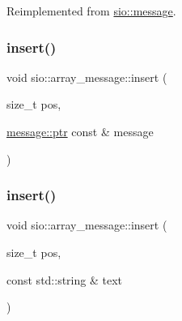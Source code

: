 Reimplemented from \hyperlink{classsio_1_1message_af310192e16427f655dc89c627aae4fe7}{sio\+::message}.

\mbox{\label{classsio_1_1array__message_a5bf35c4605d386ca824c0948d991bed2}} 
\subsubsection{\texorpdfstring{insert()}{insert()}\hspace{0.1cm}{\footnotesize\ttfamily [1/5]}}
{\footnotesize\ttfamily void sio\+::array\+\_\+message\+::insert (\begin{DoxyParamCaption}\item[{size\+\_\+t}]{pos,  }\item[{\hyperlink{classsio_1_1message_a6340b6fef57e4516eb17928b1885a615}{message\+::ptr} const \&}]{message }\end{DoxyParamCaption})\hspace{0.3cm}{\ttfamily [inline]}}

\mbox{\label{classsio_1_1array__message_a6c42d79eee6b499ffd08769c741d5b7f}} 
\subsubsection{\texorpdfstring{insert()}{insert()}\hspace{0.1cm}{\footnotesize\ttfamily [2/5]}}
{\footnotesize\ttfamily void sio\+::array\+\_\+message\+::insert (\begin{DoxyParamCaption}\item[{size\+\_\+t}]{pos,  }\item[{const std\+::string \&}]{text }\end{DoxyParamCaption})\hspace{0.3cm}{\ttfamily [inline]}}

\mbox{\label{classsio_1_1array__message_a0f865c08b9da48112d4b7c628f851220}} 
